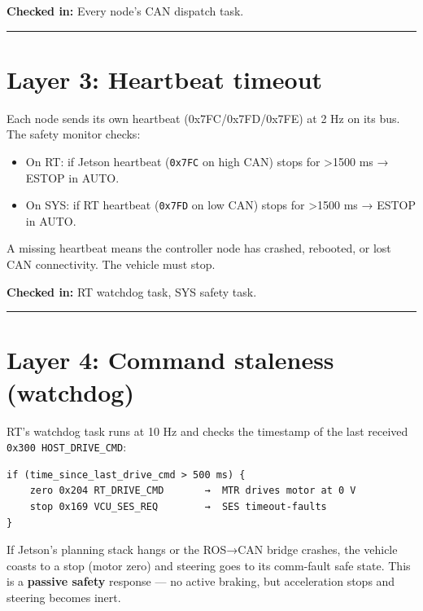 \documentclass[12pt,a4paper,oneside]{report}
\providecommand{\tightlist}{\setlength{\itemsep}{0pt}\setlength{\parskip}{0pt}}
\begin{document}
\textbf{Checked in:} Every node's CAN dispatch task.

\begin{center}\rule{0.5\linewidth}{0.5pt}\end{center}

\section{Layer 3: Heartbeat timeout}\label{layer-3-heartbeat-timeout}

Each node sends its own heartbeat (0x7FC/0x7FD/0x7FE) at 2 Hz on its bus. The
safety monitor checks:

\begin{itemize}
\tightlist
\item
  On RT: if Jetson heartbeat (\texttt{0x7FC} on high CAN) stops for
  \textgreater1500 ms → ESTOP in AUTO.
\item
  On SYS: if RT heartbeat (\texttt{0x7FD} on low CAN) stops for \textgreater1500
  ms → ESTOP in AUTO.
\end{itemize}

A missing heartbeat means the controller node has crashed, rebooted, or lost CAN
connectivity. The vehicle must stop.

\textbf{Checked in:} RT watchdog task, SYS safety task.

\begin{center}\rule{0.5\linewidth}{0.5pt}\end{center}

\section{Layer 4: Command staleness
(watchdog)}\label{layer-4-command-staleness-watchdog}

RT's watchdog task runs at 10 Hz and checks the timestamp of the last received
\texttt{0x300\ HOST\_DRIVE\_CMD}:

\begin{verbatim}
if (time_since_last_drive_cmd > 500 ms) {
    zero 0x204 RT_DRIVE_CMD       →  MTR drives motor at 0 V
    stop 0x169 VCU_SES_REQ        →  SES timeout-faults
}
\end{verbatim}

If Jetson's planning stack hangs or the ROS→CAN bridge crashes, the vehicle
coasts to a stop (motor zero) and steering goes to its comm-fault safe state.
This is a \textbf{passive safety} response --- no active braking, but
acceleration stops and steering becomes inert.
\end{document}
